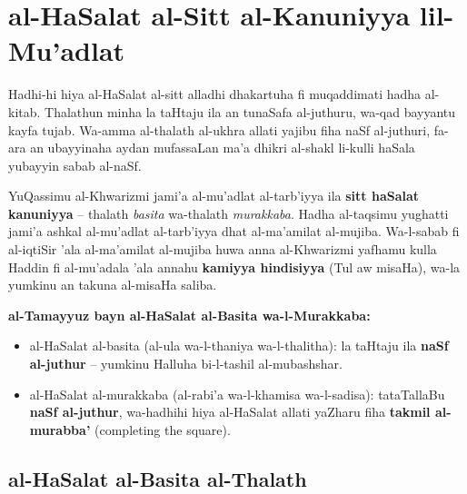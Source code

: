 \documentclass[11pt,a4paper]{book}
\begin{document}
\newpage

\chapter{al-HaSalat al-Sitt al-Kanuniyya lil-Mu'adlat}
\label{ch:six-cases}

\begin{originaltext}
Hadhi-hi hiya al-HaSalat al-sitt alladhi dhakartuha fi muqaddimati
hadha al-kitab. Thalathun minha la taHtaju ila an tunaSafa
al-juthuru, wa-qad bayyantu kayfa tujab. Wa-amma al-thalath
al-ukhra allati yajibu fiha naSf al-juthuri, fa-ara an ubayyinaha
aydan mufassaLan ma'a dhikri al-shakl li-kulli haSala yubayyin
sabab al-naSf.
\end{originaltext}

\begin{commentary}
YuQassimu al-Khwarizmi jami'a al-mu'adlat al-tarb'iyya ila
\textbf{sitt haSalat kanuniyya} -- thalath \textit{basita} wa-thalath
\textit{murakkaba}. Hadha al-taqsimu yughatti jami'a ashkal
al-mu'adlat al-tarb'iyya dhat al-ma'amilat al-mujiba. Wa-l-sabab fi
al-iqtiSir 'ala al-ma'amilat al-mujiba huwa anna al-Khwarizmi yafhamu
kulla Haddin fi al-mu'adala 'ala annahu \textbf{kamiyya hindisiyya}
(Tul aw misaHa), wa-la yumkinu an takuna al-misaHa saliba.

\vspace{0.3cm}

\textbf{al-Tamayyuz bayn al-HaSalat al-Basita wa-l-Murakkaba:}
\begin{itemize}
  \item al-HaSalat al-basita (al-ula wa-l-thaniya wa-l-thalitha): la
taHtaju ila \textbf{naSf al-juthur} -- yumkinu Halluha bi-l-tashil
al-mubashshar.
  \item al-HaSalat al-murakkaba (al-rabi'a wa-l-khamisa wa-l-sadisa):
tataTallaBu \textbf{naSf al-juthur}, wa-hadhihi hiya al-HaSalat
allati yaZharu fiha \textbf{takmil al-murabba'} (completing the square).
\end{itemize}
\end{commentary}

\section{al-HaSalat al-Basita al-Thalath}
\end{document}
